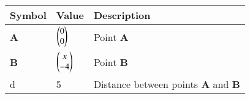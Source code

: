 \begin{tabular}{|m{5em} | m{5em} | m{10em} |}
	\hline
	\textbf{Symbol} & \textbf{Value} &\textbf{Description}\\
	\hline
		\textbf{A} & $\begin{pmatrix}0\\0\end{pmatrix}$ & Point \textbf{A}\\
	\hline
		\textbf{B} & $\begin{pmatrix}x\\-4\end{pmatrix}$ & Point \textbf{B}\\
	\hline
		d          & 5              & Distance between points \textbf{A} and \textbf{B}\\
	\hline
\end{tabular}

